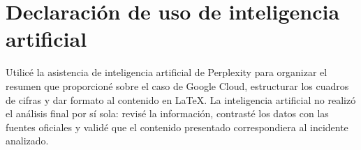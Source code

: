 \documentclass[11pt]{article}
\begin{document}
\section*{Declaración de uso de inteligencia artificial}

Utilicé la asistencia de inteligencia artificial de Perplexity para organizar el resumen que proporcioné sobre
el caso de Google Cloud, estructurar los cuadros de cifras y dar formato al contenido en
LaTeX. La inteligencia artificial no realizó el análisis final por sí sola: revisé la
información, contrasté los datos con las fuentes oficiales y validé que el contenido
presentado correspondiera al incidente analizado. \cite{googlecloud19009,corbett2013spanner}

\printbibliography
\end{document}
